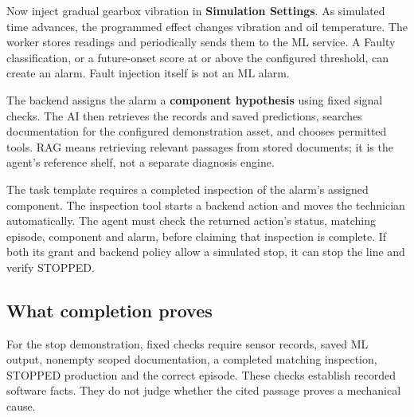 Now inject gradual gearbox vibration in \textbf{Simulation Settings}. As simulated time advances, the programmed effect changes vibration and oil temperature. The worker stores readings and periodically sends them to the ML service. A Faulty classification, or a future-onset score at or above the configured threshold, can create an alarm. Fault injection itself is not an ML alarm.

The backend assigns the alarm a \textbf{component hypothesis} using fixed signal checks. The AI then retrieves the records and saved predictions, searches documentation for the configured demonstration asset, and chooses permitted tools. RAG means retrieving relevant passages from stored documents; it is the agent's reference shelf, not a separate diagnosis engine.

The task template requires a completed inspection of the alarm's assigned component. The inspection tool starts a backend action and moves the technician automatically. The agent must check the returned action's status, matching episode, component and alarm, before claiming that inspection is complete. If both its grant and backend policy allow a simulated stop, it can stop the line and verify STOPPED.

\subsection*{What completion proves}
For the stop demonstration, fixed checks require sensor records, saved ML output, nonempty scoped documentation, a completed matching inspection, STOPPED production and the correct episode. These checks establish recorded software facts. They do not judge whether the cited passage proves a mechanical cause.

